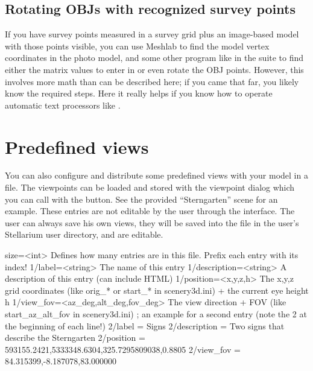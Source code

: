 \subsection{Rotating OBJs with recognized survey points}
\label{sec:scenery3d:RotatingOBJ}

If you have survey points measured in a survey grid plus an image-based model
with those points visible, you can use Meshlab to find the model
vertex coordinates in the photo model, and some other program like
 in the  suite to find either the matrix
values to enter in  or even rotate the OBJ
points. However, this involves more math than can be described here;
if you came that far, you likely know the required steps.  Here it
really helps if you know how to operate automatic text processors like
.

\section{Predefined views}
You can also configure and distribute some predefined views with your
model in a  file. The viewpoints can be loaded
and stored with the viewpoint dialog which you can call with the
 button. See the provided
``Sterngarten'' scene for an example. These entries are not editable
by the user through the interface. The user can always save his own
views, they will be saved into the file  in the
user's Stellarium user directory, and are editable.

\begin{configfileScr}
[StoredViews]
size=<int>              Defines how many entries are in this file. 
                        Prefix each entry with its index!
1/label=<string>        The name of this entry
1/description=<string>  A description of this entry (can include HTML)
1/position=<x,y,z,h>    The x,y,z grid coordinates 
                        (like orig_* or start_* in scenery3d.ini) 
                        + the current eye height h
1/view_fov=<az_deg,alt_deg,fov_deg>  The view direction + FOV
                                     (like start_az_alt_fov in scenery3d.ini)
; an example for a second entry (note the 2 at the beginning of each line!)
2/label       = Signs
2/description = Two signs that describe the Sterngarten
2/position    = 593155.2421,5333348.6304,325.7295809038,0.8805
2/view_fov    = 84.315399,-8.187078,83.000000
\end{configfileScr}

